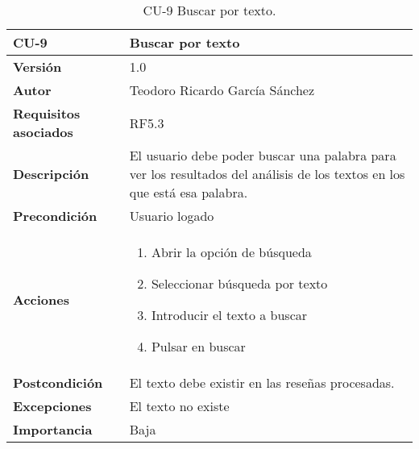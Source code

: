 \begin{table}[p]
	\centering
	\begin{tabularx}{\linewidth}{ p{} p{} }
		\toprule
		\textbf{CU-9}    & \textbf{Buscar por texto}\\
		\toprule
		\textbf{Versión}              & 1.0    \\
		\textbf{Autor}                & Teodoro Ricardo García Sánchez \\
		\textbf{Requisitos asociados} & RF5.3 \\
		\textbf{Descripción}          & El usuario debe poder buscar una palabra para ver los resultados del análisis de los textos en los que está esa palabra. \\
		\textbf{Precondición}         & Usuario logado \\
		\textbf{Acciones}             &
		\begin{enumerate}
			\def\labelenumi{\arabic{enumi}.}
			\tightlist
			\item Abrir la opción de búsqueda
			\item Seleccionar búsqueda por texto
			\item Introducir el texto a buscar
			\item Pulsar en buscar
		\end{enumerate}\\
		\textbf{Postcondición}        & El texto debe existir en las reseñas procesadas.\\
		\textbf{Excepciones}          & El texto no existe \\
		\textbf{Importancia}          & Baja \\
		\bottomrule
	\end{tabularx}
	\caption{CU-9 Buscar por texto.}
\end{table}
